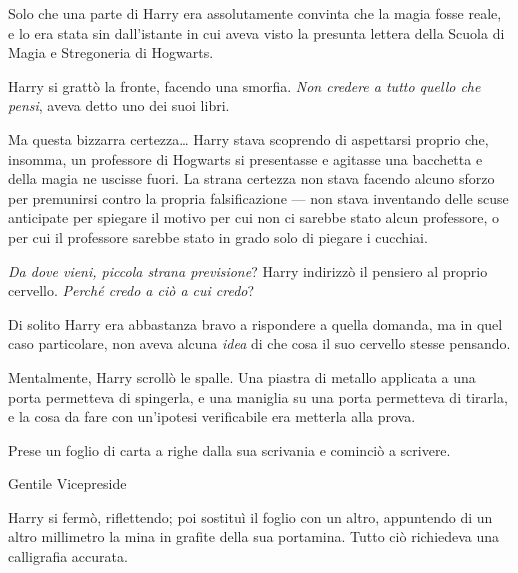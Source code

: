 Solo che una parte di Harry era assolutamente convinta che la magia fosse reale, e lo era stata sin dall’istante in cui aveva visto la presunta lettera della Scuola di Magia e Stregoneria di Hogwarts.

Harry si grattò la fronte, facendo una smorfia. \emph{Non credere a tutto quello che pensi}, aveva detto uno dei suoi libri.

Ma questa bizzarra certezza… Harry stava scoprendo di aspettarsi proprio che, insomma, un professore di Hogwarts si presentasse e agitasse una bacchetta e della magia ne uscisse fuori. La strana certezza non stava facendo alcuno sforzo per premunirsi contro la propria falsificazione — non stava inventando delle scuse anticipate per spiegare il motivo per cui non ci sarebbe stato alcun professore, o per cui il professore sarebbe stato in grado solo di piegare i cucchiai.

\emph{Da dove vieni, piccola strana previsione}? Harry indirizzò il pensiero al proprio cervello. \emph{Perché credo a ciò a cui credo}?

Di solito Harry era abbastanza bravo a rispondere a quella domanda, ma in quel caso particolare, non aveva alcuna \emph{idea} di che cosa il suo cervello stesse pensando.

Mentalmente, Harry scrollò le spalle. Una piastra di metallo applicata a una porta permetteva di spingerla, e una maniglia su una porta permetteva di tirarla, e la cosa da fare con un’ipotesi verificabile era metterla alla prova.

Prese un foglio di carta a righe dalla sua scrivania e cominciò a scrivere.

\vspace{1em}
\begin{addmargin}[3em]{3em}%
\begin{itpars}
Gentile Vicepreside
\end{itpars}
\end{addmargin}
\vspace{1em}

Harry si fermò, riflettendo; poi sostituì il foglio con un altro, appuntendo di un altro millimetro la mina in grafite della sua portamina. Tutto ciò richiedeva una calligrafia accurata.

